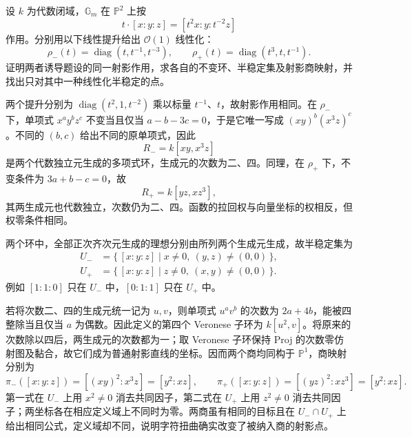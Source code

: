 \begin{optionalexercise}\label{b5:ex:22-projective-twist}
	设 \(k\) 为代数闭域，\(\mathbb G_m\) 在 \(\mathbb P^2\) 上按
	\[
		t\cdot[x:y:z]=[t^2x:y:t^{-2}z]
	\]
	作用。分别用以下线性提升给出 \(\mathcal O(1)\) 线性化：
	\[
		\rho_-(t)=\operatorname{diag}(t,t^{-1},t^{-3}),\qquad \rho_+(t)=\operatorname{diag}(t^3,t,t^{-1}).
	\]
	证明两者诱导题设的同一射影作用，求各自的不变环、半稳定集及射影商映射，并找出只对其中一种线性化半稳定的点。
\end{optionalexercise}
\begin{solution}
	两个提升分别为 \(\operatorname{diag}(t^2,1,t^{-2})\) 乘以标量 \(t^{-1}\)、\(t\)，故射影作用相同。在 \(\rho_-\) 下，单项式 \(x^ay^bz^c\) 不变当且仅当 \(a-b-3c=0\)，于是它唯一写成 \((xy)^b(x^3z)^c\)。不同的 \((b,c)\) 给出不同的原单项式，因此
	\[
		R_-=k[xy,x^3z]
	\]
	是两个代数独立元生成的多项式环，生成元的次数为二、四。同理，在 \(\rho_+\) 下，不变条件为 \(3a+b-c=0\)，故
	\[
		R_+=k[yz,xz^3],
	\]
	其两生成元也代数独立，次数仍为二、四。函数的拉回权与向量坐标的权相反，但权零条件相同。

	两个环中，全部正次齐次元生成的理想分别由所列两个生成元生成，故半稳定集为
	\[
		\begin{aligned}
			U_-&=\{\,[x:y:z]\mid x\ne0,\ (y,z)\ne(0,0)\,\},\\
			U_+&=\{\,[x:y:z]\mid z\ne0,\ (x,y)\ne(0,0)\,\}.
		\end{aligned}
	\]
	例如 \([1:1:0]\) 只在 \(U_-\) 中，\([0:1:1]\) 只在 \(U_+\) 中。

	若将次数二、四的生成元统一记为 \(u,v\)，则单项式 \(u^av^b\) 的次数为 \(2a+4b\)，能被四整除当且仅当 \(a\) 为偶数。因此定义的第四个 Veronese 子环为 \(k[u^2,v]\)。将原来的次数除以四后，两生成元的次数都为一；取 Veronese 子环保持 Proj 的次数零仿射图及黏合，故它们成为普通射影直线的坐标。因而两个商均同构于 \(\mathbb P^1\)，商映射分别为
	\[
		\pi_-([x:y:z])=[(xy)^2:x^3z]=[y^2:xz],\qquad \pi_+([x:y:z])=[(yz)^2:xz^3]=[y^2:xz].
	\]
	第一式在 \(U_-\) 上用 \(x^2\ne0\) 消去共同因子，第二式在 \(U_+\) 上用 \(z^2\ne0\) 消去共同因子；两坐标各在相应定义域上不同时为零。两商虽有相同的目标且在 \(U_-\cap U_+\) 上给出相同公式，定义域却不同，说明字符扭曲确实改变了被纳入商的射影点。
\end{solution}
